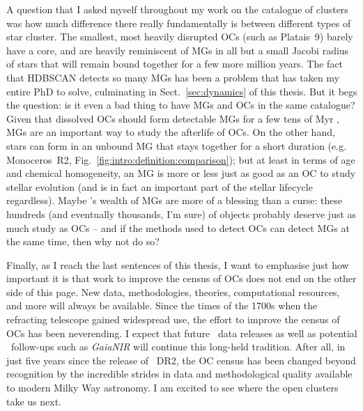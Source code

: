 A question that I asked myself throughout my work on the catalogue of clusters was how much difference there really fundamentally is between different types of star cluster. The smallest, most heavily disrupted OCs (such as Platais~9) barely have a core, and are heavily reminiscent of MGs in all but a small Jacobi radius of stars that will remain bound together for a few more million years. The fact that HDBSCAN detects so many MGs has been a problem that has taken my entire PhD to solve, culminating in Sect.~\ref{sec:dynamics} of this thesis. But it begs the question: is it even a bad thing to have MGs and OCs in the same catalogue? Given that dissolved OCs should form detectable MGs for a few tens of Myr \citep{portegies_zwart_young_2010}, MGs are an important way to study the afterlife of OCs. On the other hand, stars can form in an unbound MG that stays together for a short duration (e.g. Monoceros~R2, Fig.~\ref{fig:intro:definition:comparison}); but at least in terms of age and chemical homogeneity, an MG is more or less just as good as an OC to study stellar evolution (and is in fact an important part of the stellar lifecycle regardless). Maybe \gaia's wealth of MGs are more of a blessing than a curse: these hundreds (and eventually thousands, I'm sure) of objects probably deserve just as much study as OCs -- and if the methods used to detect OCs can detect MGs at the same time, then why not do so?

Finally, as I reach the last sentences of this thesis, I want to emphasise just how important it is that work to improve the census of OCs does not end on the other side of this page. New data, methodologies, theories, computational resources, and more will always be available. Since the times of the 1700s when the refracting telescope gained widespread use, the effort to improve the census of OCs has been neverending. I expect that future \gaia\ data releases as well as potential \gaia\ follow-ups such as \emph{GaiaNIR} will continue this long-held tradition. After all, in just five years since the release of \gaia\ DR2, the OC census has been changed beyond recognition by the incredible strides in data and methodological quality available to modern Milky Way astronomy. I am excited to see where the open clusters take us next.







